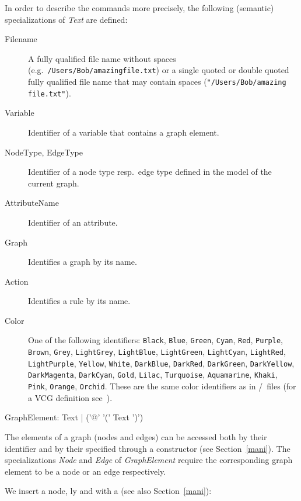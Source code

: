 In order to describe the commands more precisely, the following (semantic) specializations of \emph{Text} are defined:
\begin{description}
  \item[Filename]A fully qualified file name without spaces (e.g.\ \texttt{/Users/Bob/amazing\textunderscore file.txt}) or a single quoted or double quoted fully qualified file name that may contain spaces (\texttt{"/Users/Bob/amazing file.txt"}).
  \item[Variable] Identifier of a variable that contains a graph element. 
  \item[NodeType, EdgeType] Identifier of a node type resp.\ edge type defined in the model of the current graph.
  \item[AttributeName] Identifier of an attribute.
  \item[Graph] Identifies a graph by its name.
  \item[Action] Identifies a rule by its name.
  \item[Color] One of the following  identifiers: \texttt{Black}, \texttt{Blue}, \texttt{Green}, \texttt{Cyan}, \texttt{Red}, \texttt{Purple}, \texttt{Brown}, \texttt{Grey}, \texttt{LightGrey}, \texttt{LightBlue}, \texttt{LightGreen}, \texttt{LightCyan}, \texttt{LightRed}, \texttt{LightPurple}, \texttt{Yel\-low}, \texttt{White}, \texttt{DarkBlue}, \texttt{DarkRed}, \texttt{DarkGreen}, \texttt{DarkYellow}, \texttt{DarkMagenta}, \texttt{DarkCyan}, \texttt{Gold}, \texttt{Lilac}, \texttt{Turquoise}, \texttt{Aquamarine}, \texttt{Khaki}, \texttt{Pink}, \texttt{Orange}, \texttt{Orchid}. These are the same color identifiers as in /\yComp\ files (for a VCG definition see~\cite{vcg}).
\end{description}
\makeatletter
\begin{rail}
  GraphElement: Text | ('@' '(' Text ')')
\end{rail}
\makeatother
The elements of a graph (nodes and edges) can be accessed both by their  identifier and by their  specified through a constructor (see Section~\ref{mani}).
The specializations \emph{Node} and \emph{Edge} of \emph{GraphElement} require the corresponding graph element to be a node or an edge respectively.
\begin{example}
\label{persistentex} 
We insert a node, ly and with a  (see also Section~\ref{mani}):
\end{example}
